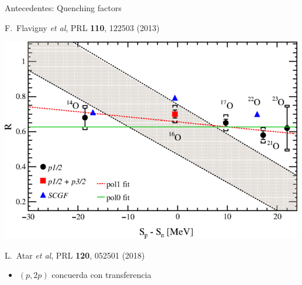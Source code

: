 \documentclass{beamer}
\begin{document}
\begin{frame}{Antecedentes: Quenching factors}
\begin{minipage}{0.45\textwidth}
\begin{center}
        \tiny F.~Flavigny \textit{et al}, PRL \textbf{110}, 122503 (2013)
    \end{center}
    \end{minipage}

\begin{center}
    \begin{minipage}{0.45\textwidth}
    \begin{center}
    \includegraphics[height=0.3\textheight]{atar.png}
   
        \tiny L.~Atar \textit{et al}, PRL \textbf{120}, 052501 (2018)
    \end{center}
    \end{minipage}
\end{center}

\begin{itemize}
\item $(p,2p)$ concuerda con transferencia
\end{itemize}
    
\end{frame}
\end{document}
